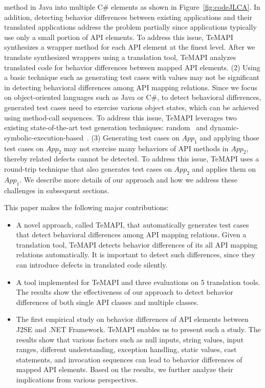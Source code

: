  method in Java into multiple C\# elements as shown in Figure~\ref{fig:codeJLCA}. In addition, detecting behavior differences between existing applications and their translated applications address the problem partially since applications typically use only a small portion of API elements. To address this issue, TeMAPI synthesizes a wrapper method for each API element at the finest level. After we translate synthesized wrappers using a translation tool, TeMAPI analyzes translated code for behavior differences between mapped API elements. (2) Using a basic technique such as generating test cases with  values may not be significant in detecting behavioral differences among API mapping relations. Since we focus on object-oriented languages such as Java or C\#, to detect behavioral differences, generated test cases need to exercise various object states, which can be achieved using method-call sequences. To address this issue, TeMAPI leverages two existing state-of-the-art test generation techniques: random~\cite{pacheco2007feedback} and dynamic-symbolic-execution-based~\cite{koushik:cute, godefroid:dart, tillmann2008pex}. (3) Generating test cases on $App_1$ and applying those test cases on $App_2$ may not exercise many behaviors of API methods in $App_2$, thereby related defects cannot be detected. To address this issue, TeMAPI uses a round-trip technique that also generates test cases on $App_2$ and applies them on $App_1$. We describe more details of our approach and how we address these challenges in subsequent sections.

This paper makes the following major contributions:

\begin{itemize}\vspace*{-1.5ex}
\item A novel approach, called TeMAPI, that automatically generates test cases that detect behavioral differences among API mapping relations. Given a translation tool, TeMAPI detects behavior differences of its all API mapping relations automatically. It is important to detect such differences, since they can introduce defects in translated code silently.\vspace*{-1.5ex}
\item A tool implemented for TeMAPI and three evaluations on 5 translation tools. The results show the effectiveness of our approach to detect behavior differences of both single API classes and multiple classes.\vspace*{-1.5ex}
\item The first empirical study on behavior differences of API elements between J2SE and .NET Framework. TeMAPI enables us to present such a study. The results show that various factors such as null inputs, string values, input ranges, different understanding, exception handling, static values, cast statements, and invocation sequences can lead to behavior differences of mapped API elements. Based on the results, we further analyze their implications from various perspectives.
\end{itemize}\vspace*{-1.5ex}

